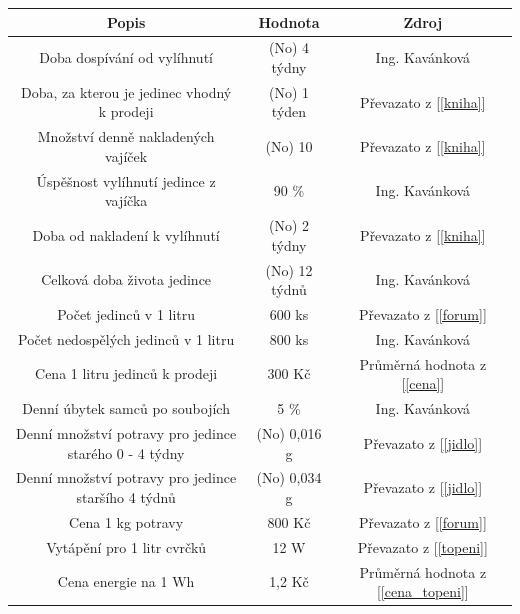 \documentclass[11pt, a4paper, titlepage]{article}
\begin{document}
    \begin{table}[H]
        \begin{tabular}{|c|c|c|}

            \hline
            \textbf{Popis}                                         & \textbf{Hodnota}      & \textbf{Zdroj}                        \\ \hline
            Doba dospívání od vylíhnutí & (No) 4 týdny & Ing. Kavánková                   \\ \hline
            Doba, za kterou je jedinec vhodný k prodeji & (No) 1 týden & Převazato z [\ref{kniha}]             \\ \hline
            Množství denně nakladených vajíček & (No) 10 & Převazato z [\ref{kniha}]             \\ \hline
            Úspěšnost vylíhnutí jedince z vajíčka & 90 \%                 & Ing. Kavánková                   \\ \hline
            Doba od nakladení k vylíhnutí & (No) 2 týdny & Převazato z [\ref{kniha}]             \\ \hline
            Celková doba života jedince & (No) 12 týdnů & Ing. Kavánková                   \\ \hline
            Počet jedinců v 1 litru & 600 ks & Převazato z [\ref{forum}]             \\ \hline
            Počet nedospělých jedinců v 1 litru & 800 ks & Ing. Kavánková              \\ \hline
            Cena 1 litru jedinců k prodeji & 300 Kč & Průměrná hodnota z [\ref{cena}]       \\ \hline
            Denní úbytek samců po soubojích & 5 \%                  & Ing. Kavánková                   \\ \hline
            Denní množství potravy pro jedince starého 0 - 4 týdny & (No) 0,016 g & Převazato z [\ref{jidlo}]             \\ \hline
            Denní množství potravy pro jedince staršího 4 týdnů & (No) 0,034 g & Převazato z [\ref{jidlo}]             \\ \hline
            Cena 1 kg potravy & 800 Kč & Převazato z [\ref{forum}]             \\ \hline
            Vytápění pro 1 litr cvrčků & 12 W & Převazato z [\ref{topeni}]            \\ \hline
            Cena energie na 1 Wh & 1,2 Kč & Průměrná hodnota z [\ref{cena_topeni}]            \\ \hline
        \end{tabular}
    \end{table}
\end{document}
